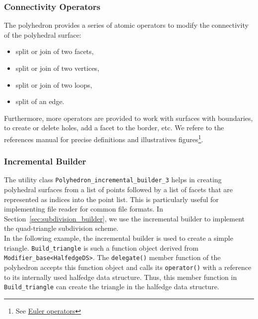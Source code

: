 \subsubsection{Connectivity Operators}

The polyhedron provides a series of atomic operators to modify the
connectivity of the polyhedral surface:
\begin{itemize}
\item split or join of two facets,
\item split or join of two vertices,
\item split or join of two loops,
\item split of an edge.
\end{itemize}

Furthermore, more operators are provided to work with surfaces with
boundaries, to create or delete holes, add a facet to the border,
etc. We refere to the references manual for precise definitions and
illustratives figures\footnote{See
\href{http://www.cgal.org/Manual/doc_html/basic_lib/Polyhedron/Chapter_main.html}{Euler 
operators}}.

\subsubsection{Incremental Builder}
\label{sec:builder}

The utility class \verb+Polyhedron_incremental_builder_3+ helps in
creating polyhedral surfaces from a list of points followed by a list
of facets that are represented as indices into the point list. This is
particularly useful for implementing file reader for common file
formats. In Section~\ref{sec:subdivision_builder}, we use the
incremental builder to implement the quad-triangle subdivision
scheme.\\

In the following example, the incremental builder is used to create a
simple triangle. \verb+Build_triangle+ is such a function object
derived from \verb+Modifier_base<HalfedgeDS>+. The
\verb+delegate()+ member function of the polyhedron accepts this function
object and calls its \verb+operator()+ with a reference to its
internally used halfedge data structure. Thus, this member function in
\verb+Build_triangle+ can create the triangle in the 
halfedge data structure.

